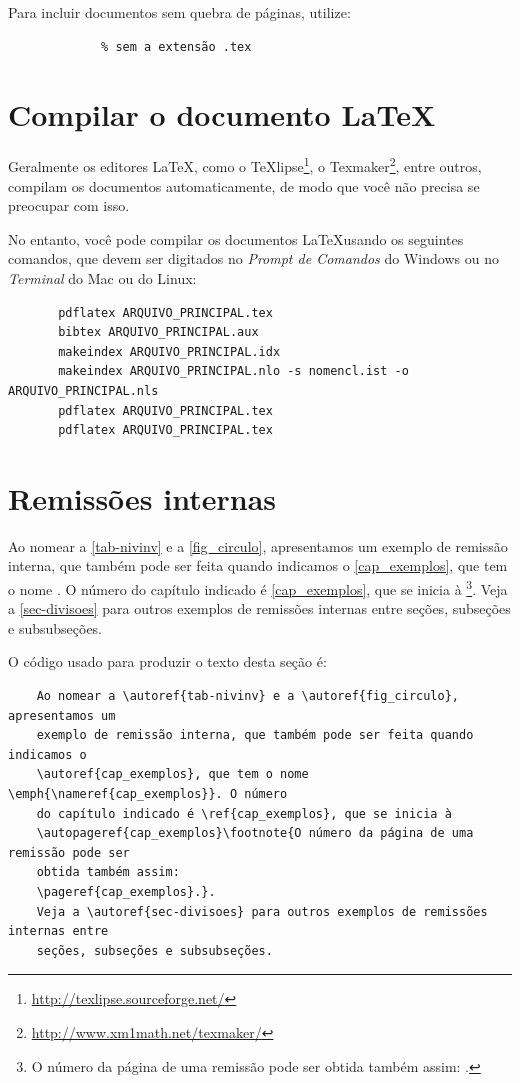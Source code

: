     Para incluir documentos sem quebra de páginas, utilize:

    \begin{verbatim}
             % sem a extensão .tex
    \end{verbatim}

    \section{Compilar o documento \LaTeX}

    Geralmente os editores \LaTeX, como o
    TeXlipse\footnote{\url{http://texlipse.sourceforge.net/}}, o
    Texmaker\footnote{\url{http://www.xm1math.net/texmaker/}}, entre outros,
    compilam os documentos automaticamente, de modo que você não precisa se
    preocupar com isso.

    No entanto, você pode compilar os documentos \LaTeX usando os seguintes
    comandos, que devem ser digitados no \emph{Prompt de Comandos} do Windows ou no
    \emph{Terminal} do Mac ou do Linux:

    \begin{verbatim}
       pdflatex ARQUIVO_PRINCIPAL.tex
       bibtex ARQUIVO_PRINCIPAL.aux
       makeindex ARQUIVO_PRINCIPAL.idx
       makeindex ARQUIVO_PRINCIPAL.nlo -s nomencl.ist -o ARQUIVO_PRINCIPAL.nls
       pdflatex ARQUIVO_PRINCIPAL.tex
       pdflatex ARQUIVO_PRINCIPAL.tex
    \end{verbatim}

    \section{Remissões internas}

    Ao nomear a \autoref{tab-nivinv} e a \autoref{fig_circulo}, apresentamos um
    exemplo de remissão interna, que também pode ser feita quando indicamos o
    \autoref{cap_exemplos}, que tem o nome \emph{}. O número
    do capítulo indicado é \ref{cap_exemplos}, que se inicia à
    \footnote{O número da página de uma remissão pode ser
    obtida também assim:
    \pageref{cap_exemplos}.}.
    Veja a \autoref{sec-divisoes} para outros exemplos de remissões internas entre
    seções, subseções e subsubseções.

    O código usado para produzir o texto desta seção é:

    \begin{verbatim}
    Ao nomear a \autoref{tab-nivinv} e a \autoref{fig_circulo}, apresentamos um
    exemplo de remissão interna, que também pode ser feita quando indicamos o
    \autoref{cap_exemplos}, que tem o nome \emph{\nameref{cap_exemplos}}. O número
    do capítulo indicado é \ref{cap_exemplos}, que se inicia à
    \autopageref{cap_exemplos}\footnote{O número da página de uma remissão pode ser
    obtida também assim:
    \pageref{cap_exemplos}.}.
    Veja a \autoref{sec-divisoes} para outros exemplos de remissões internas entre
    seções, subseções e subsubseções.
    \end{verbatim}

